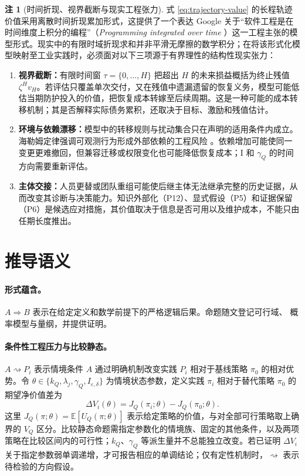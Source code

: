\documentclass[11pt,a4paper]{ctexart}
\numberwithin{equation}{section}
\theoremstyle{definition}
\newtheorem{remark}[definition]{注}
\theoremstyle{plain}
\begin{document}
\begin{remark}[时间折现、视界截断与现实工程张力]
\label{rem:time-integration-truncation}
式 \eqref{eq:trajectory-value} 的长程轨迹价值采用离散时间折现累加形式，这提供了一个表达 Google 关于“软件工程是在时间维度上积分的编程”（\textit{Programming integrated over time} \cite{winters2020}）这一工程主张的模型形式。现实中的有限时域折现求和并非平滑无摩擦的数学积分；在将该形式化模型映射至工业实践时，必须面对以下三项源于有界理性的结构性现实张力：
\begin{enumerate}[label=(\arabic*)]
    \item \textbf{视界截断：}有限时间窗 $\tau=\{0,\ldots,H\}$ 把超出 $H$ 的未来损益概括为终止残值 $\zeta^H v_H$。若评估只覆盖单次交付，又在残值中遗漏遗留的恢复义务，模型可能低估当期防护投入的价值，把恢复成本转嫁至后续周期。这是一种可能的成本转移机制；其是否解释实际债务累积，还取决于目标、激励和残值估计。
    \item \textbf{环境与依赖漂移：}模型中的转移规则与扰动集合只在声明的适用条件内成立。海勒姆定律强调可观测行为形成外部依赖的工程风险 \cite{winters2020}。依赖增加可能使同一变更更难撤回，但兼容迁移或权限变化也可能降低恢复成本；I 和 $\gamma_Q$ 的时间方向需要重新评估。
    \item \textbf{主体交接：}人员更替或团队重组可能使后继主体无法继承完整的历史证据，从而改变其诊断与决策能力。知识外部化（P12）、显式假设（P5）和证据保留（P6）是候选应对措施，其价值取决于信息是否可用以及维护成本，不能只由任期长度推出。
\end{enumerate}
\end{remark}

\section{推导语义}

\paragraph{形式蕴含。}
$A\Longrightarrow B$ 表示在给定定义和数学前提下的严格逻辑后果。命题随文登记可行域、
概率模型与量纲，并提供证明。

\paragraph{条件性工程压力与比较静态。}
$A\rightsquigarrow P_i$ 表示情境条件 $A$ 通过明确机制改变实践 $P_i$ 相对于基线策略 $\pi_0$ 的相对优势。令 $\theta \in \{k_Q, \lambda_j, \gamma_Q, I_{\varepsilon,\delta}\}$ 为情境状态参数，定义实践 $\pi_i$ 相对于替代策略 $\pi_0$ 的期望净价值差为
\[
\Delta V_i(\theta)=J_Q(\pi_i;\theta)-J_Q(\pi_0;\theta).
\]
这里 $J_Q(\pi;\theta)=\mathbb E[U_Q(\pi;\theta)]$ 表示给定策略的价值，与对全部可行策略取上确界的 $V_Q$ 区分。比较静态命题需指定参数化的情境族、固定的其他条件，以及两项策略在比较区间内的可行性；$k_Q$、$\gamma_Q$ 等派生量并不总能独立改变。若已证明 $\Delta V_i$ 关于指定参数弱单调递增，才可报告相应的单调结论；仅有定性机制时，$\rightsquigarrow$ 表示待检验的方向假设。
\end{document}
